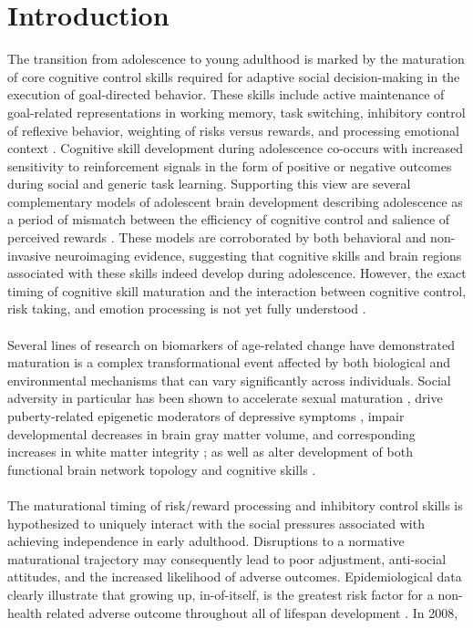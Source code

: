\documentclass[utf8]{frontiersSCNS} %
\begin{document}
\section{Introduction}
The transition from adolescence to young adulthood is marked by the maturation of core cognitive control skills required for adaptive social decision-making in the execution of goal-directed behavior. These skills include active maintenance of goal-related representations in working memory, task switching, inhibitory control of reflexive behavior, weighting of risks versus rewards, and processing emotional context \citep{luna2015integrative}. Cognitive skill development during adolescence co-occurs with increased sensitivity to reinforcement signals in the form of positive or negative outcomes during social and generic task learning. Supporting this view are several complementary models of adolescent brain development describing adolescence as a period of mismatch between the efficiency of cognitive control and salience of perceived rewards \citep{Steinberg2010, CaseyEtAl2008, LunaWright2016, rosenbaum2020valence}. These models are corroborated by both behavioral and non-invasive neuroimaging evidence, suggesting that cognitive skills and brain regions associated with these skills indeed develop during adolescence.  However, the exact timing of cognitive skill maturation and the interaction between cognitive control, risk taking, and emotion processing is not yet fully understood \citep{shulman2016dual, duell2016interaction}.\paragraph*{} Several lines of research on biomarkers of age-related change have demonstrated maturation is a complex transformational event affected by both biological and environmental mechanisms that can vary significantly across individuals. Social adversity in particular has been shown to accelerate sexual maturation \citep{rickard2014childhood}, drive puberty-related epigenetic moderators of depressive symptoms \citep{sumner2019early}, impair developmental decreases in brain gray matter volume, and corresponding increases in white matter integrity \citep{gur2019burden, Gogtay2004}; as well as alter development of both functional brain network topology \citep{tooley2020associations} and cognitive skills \citep{mclaughlin2019childhood, belsky2019early}. \paragraph*{} The maturational timing of risk/reward processing and inhibitory control skills is hypothesized to uniquely interact with the social pressures associated with achieving independence in early adulthood. Disruptions to a normative maturational trajectory may consequently lead to poor adjustment, anti-social attitudes, and the increased likelihood of adverse outcomes. Epidemiological data clearly illustrate  that growing up, in-of-itself, is the greatest risk factor for a non-health related adverse outcome throughout all of lifespan development \citep{turner2006effect}. In 2008, 
\end{document}
